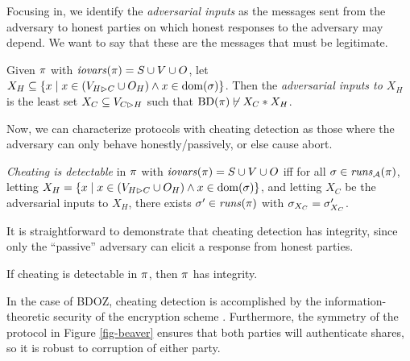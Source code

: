Focusing in, we identify the \emph{adversarial inputs} as the messages
sent from the adversary to honest parties on which honest responses
to the adversary may depend. We want to say that these are the messages
that must be legitimate.
\begin{definition}
  Given $\pi$ with $\mathit{iovars}(\pi) = S \cup V \cup O$,
  let $X_H \subseteq \{ x \mid x \in (V_{H \rhd C} \cup O_H) \wedge x \in \mathrm{dom}(\sigma) \}$.
  Then the \emph{adversarial inputs to $X_H$} is the least set
  $X_C \subseteq V_{C \rhd H}$ such that $\mathrm{BD}(\pi) \not\vdash X_C * X_H$.
\end{definition}
Now, we can characterize protocols with cheating detection as those where
the adversary can only behave honestly/passively, or else cause abort.
\begin{definition}
  \emph{Cheating is detectable} in $\pi$ with $\mathit{iovars}(\pi) = S \cup V \cup O$ iff
  for all  $\sigma \in \mathit{runs}_{\mathcal{A}}(\pi)$,
  letting $X_H = \{ x \mid x \in (V_{H \rhd C} \cup O_H) \wedge x \in \mathrm{dom}(\sigma) \}$,
  and letting $X_C$ be the adversarial inputs to $X_H$,
  there exists $\sigma'\in \mathit{runs}(\pi)$
  with $\sigma_{X_C} = \sigma'_{X_C}$.  
\end{definition}

It is straightforward to demonstrate that cheating detection has integrity,
since only the ``passive'' adversary can elicit a response from honest parties. 
\begin{lemma}
  \label{lemma-cheating}
  If cheating is detectable in $\pi$, then $\pi$ has integrity.
\end{lemma}

In the case of BDOZ, cheating detection is accomplished by the information-theoretic
security of the encryption scheme \cite{evans2018pragmatic}. Furthermore, the symmetry of
the protocol in Figure \ref{fig-beaver} ensures that both parties will authenticate
shares, so it is robust to corruption of either party. 
